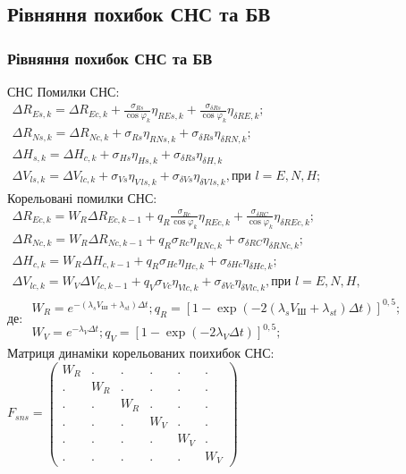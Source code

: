 \documentclass[ucs,compress]{beamer}    %
\begin{document}
\subsection{Рівняння похибок СНС та БВ} 
\begin{frame}[plain]
\frametitle{Рівняння похибок СНС та БВ}
\tiny
\begin{block}{СНС}
Помилки СНС:\\
$\begin{array}{l} 
{\Delta R_{Es,k} =\Delta R_{Ec,k} +\frac{\sigma_{Rs} }{\cos \varphi_{k} } \eta_{REs,k} +\frac{\sigma_{\delta Rs} }{\cos \varphi_{k} } \eta_{\delta RE,k} ;} \\ 
{\Delta R_{Ns,k} =\Delta R_{Nc,k} +\sigma_{Rs} \eta_{RNs,k} +\sigma_{\delta Rs} \eta_{\delta RN,k} ;} \\ 
{\Delta H_{s,k} =\Delta H_{c,k} +\sigma_{Hs} \eta_{Hs,k} +\sigma_{\delta Rs} \eta_{\delta H,k} }\\ 
{\Delta V_{ls,k} =\Delta V_{lc,k} +\sigma_{Vs} \eta_{V\, ls,k} +\sigma_{\delta Vs} \eta_{\delta V\, ls,k}, \text{при } l=E,N,H;} 
\end{array}$\\
Корельовані помилки СНС:\\
$\begin{array}{l} 
{\Delta R_{Ec,k}=W_{R} \Delta R_{Ec,k-1} +q_{R} \frac{\sigma_{Rc} }{\cos \varphi_{k} } \eta_{REc,k} +\frac{\sigma_{\delta RC} }{\cos \varphi_{k} } \eta_{\delta REc,k} ;} \\ 
{\Delta R_{Nc,k}=W_{R} \Delta R_{Nc,k-1} +q_{R} \sigma_{Rc} \eta_{RNc,k} +\sigma_{\delta RC} \eta_{\delta RNc,k} ;} \\ 
{\Delta H_{c,k}=W_{R}  \Delta H_{c,k-1}  +q_{R} \sigma_{Hc} \eta_{Hc,k} +\sigma_{\delta Hc} \eta_{\delta Hc,k} ;} \\ 
{\Delta V_{lc,k} =W_{V} \Delta V_{lc,k-1} +q_{V}\sigma_{Vc} \eta_{V lc,k} +\sigma_{\delta Vc} \eta_{\delta V lc,k}, \text{при } l=E,N,H,} 
\end{array} $\\
де:
$\begin{array}{l}
{W_{R} =e^{-(\lambda_{s} V_{\text{Ш}} +\lambda_{st} )\Delta t} ; }
{q_{R} =\left[1-\exp \left(-2\left(\lambda_{s} V_{\text{Ш}} +\lambda_{st} \right)\Delta t\right)\right]^{0,5};}\\
{W_{V} =e^{-\lambda_{V} \Delta t};}
{q_{V} =\left[1-\exp \left(-2 \lambda_{V} \Delta t\right)\right]^{0,5};}

\end{array}$\\
Матриця динаміки корельованих поихибок СНС:
$F_{sns} =\left(\begin{array}{cccccccc} 
{W_{R}} & {.} & {.} & {.} & {.} & {.} \\ 
{.} & {W_{R} } & {.} & {.} & {.} & {.} \\ 
{.} & {.} & {W_{R} } & {.} & {.} & {.} \\ 
{.} & {.} & {.} & {W_{V} } & {.} & {.} \\ 
{.} & {.} & {.} & {.} & {W_{V} } & {.} \\ 
{.} & {.} & {.} & {.} & {.} & {W_{V} } 
\end{array}\right) 
$
\end{block}


\end{frame}
\end{document}
